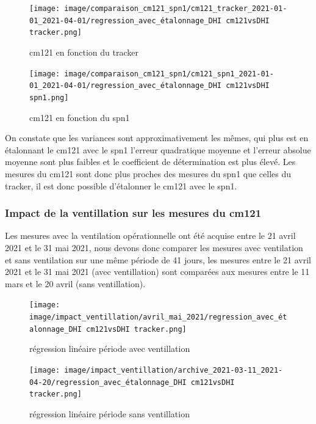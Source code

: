 \documentclass[12pt,a4paper]{article}
\begin{document}
\begin{flushleft}
\begin{figure}[H]
\centering
\texttt{[image: image/comparaison\_cm121\_spn1/cm121\_tracker\_2021-01-01\_2021-04-01/regression\_avec\_étalonnage\_DHI cm121vsDHI tracker.png]} 
\caption{cm121 en fonction du tracker}  
\end{figure}

\begin{figure}[H]
\centering
\texttt{[image: image/comparaison\_cm121\_spn1/cm121\_spn1\_2021-01-01\_2021-04-01/regression\_avec\_étalonnage\_DHI cm121vsDHI spn1.png]}  
\caption{cm121 en fonction du spn1}  
\end{figure}

On constate que les variances sont approximativement les mêmes, qui plus est en étalonnant le cm121 avec le spn1 l'erreur quadratique moyenne et l'erreur absolue moyenne sont plus faibles et le coefficient de détermination est plus élevé. Les mesures du cm121 sont donc plus proches des mesures du spn1 que celles du tracker, il est donc possible d'étalonner le cm121 avec le spn1.  

\subsubsection{Impact de la ventillation sur les mesures du cm121}

Les mesures avec la ventilation opérationnelle ont été acquise entre le 21 avril 2021 et le 31 mai 2021, nous devons donc comparer les mesures avec ventilation et sans ventilation sur une même période de 41 jours, les mesures entre le 21 avril 2021 et le 31 mai 2021 (avec ventillation) sont comparées aux mesures entre le 11 mars et le 20 avril (sans ventillation).

\begin{figure}[H]
\centering
\texttt{[image: image/impact\_ventillation/avril\_mai\_2021/regression\_avec\_étalonnage\_DHI cm121vsDHI tracker.png]} 
\caption{régression linéaire période avec ventillation}  
\end{figure}

\begin{figure}[H]
\centering
\texttt{[image: image/impact\_ventillation/archive\_2021-03-11\_2021-04-20/regression\_avec\_étalonnage\_DHI cm121vsDHI tracker.png]}  
\caption{régression linéaire période sans ventillation}  
\end{figure}


\end{flushleft}
\end{document}
